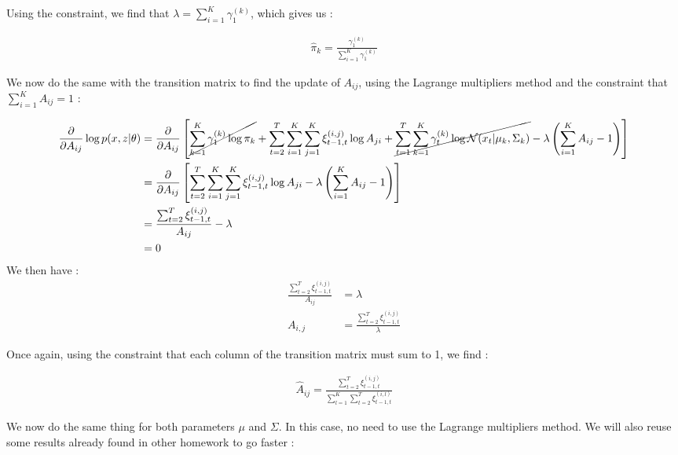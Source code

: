 \documentclass[11pt]{article}
\begin{document}
\begin{enumerate}
Using the constraint, we find that $\lambda = \sum_{i=1}^{K} \gamma_{1}^{(k)}$, which gives us :

\begin{align*}
\boxed{\hat{\pi}_k = \frac{\gamma_{1}^{(k)}}{\sum_{i=1}^{K} \gamma_{1}^{(k)}}}
\end{align*}

We now do the same with the transition matrix to find the update of $A_{ij}$, using the Lagrange multipliers method and the constraint that $\sum_{i=1}^{K} A_{ij} = 1$ :

{\small
\begin{align*}
\frac{\partial}{\partial A_{ij}} \log p(x,z|\theta) & = \frac{\partial}{\partial A_{ij}}\left[ \cancel{\sum_{k=1}^{K} \gamma_{1}^{(k)} \log \pi_{k}} + \sum_{t=2}^{T} \sum_{i=1}^{K}\sum_{j = 1}^{K} \xi_{t-1,t}^{(i,j)} \log A_{ji} + \cancel{\sum_{t=1}^{T} \sum_{k=1}^{K} \gamma_{t}^{(k)} \log \mathcal{N}(x_t|\mu_k,\Sigma_k)} - \lambda\left(\sum_{i=1}^{K} A_{ij} - 1\right)\right]\\
													& = \frac{\partial}{\partial A_{ij}} \left[ \sum_{t=2}^{T} \sum_{i=1}^{K}\sum_{j = 1}^{K} \xi_{t-1,t}^{(i,j)} \log A_{ji} - \lambda\left(\sum_{i=1}^{K} A_{ij} - 1\right)\right]\\
													& = \frac{\sum_{t=2}^T \xi_{t-1,t}^{(i,j)}}{A_{ij}} - \lambda \\
													& = 0
\end{align*}
We then have :
\begin{align*}
\frac{\sum_{t=2}^{T} \xi_{t-1,t}^{(i,j)}}{A_{ij}} & = \lambda \\
A_{i,j} &= \frac{\sum_{t=2}^T \xi_{t-1,t}^{(i,j)}}{\lambda}
\end{align*}
}

Once again, using the constraint that each column of the transition matrix must sum to 1, we find :

\begin{align*}
\boxed{\hat{A}_{ij} = \frac{\sum_{t=2}^{T}\xi_{t-1,t}^{(i,j)}}{\sum_{l=1}^{K} \sum_{t=2}^{T} \xi_{t-1,t}^{(i,l)}}}
\end{align*}

We now do the same thing for both parameters $\mu$ and $\Sigma$. In this case, no need to use the Lagrange multipliers method. We will also reuse some results already found in other homework to go faster :


\end{enumerate}
\end{document}
